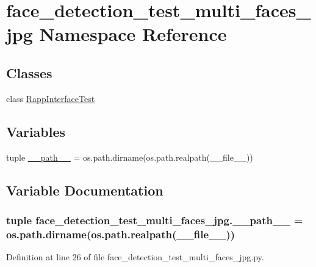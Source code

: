 \hypertarget{namespaceface__detection__test__multi__faces__jpg}{\section{face\-\_\-detection\-\_\-test\-\_\-multi\-\_\-faces\-\_\-jpg Namespace Reference}
\label{namespaceface__detection__test__multi__faces__jpg}
}
\subsection*{Classes}
\begin{DoxyCompactItemize}
\item 
class \hyperlink{classface__detection__test__multi__faces__jpg_1_1RappInterfaceTest}{Rapp\-Interface\-Test}
\end{DoxyCompactItemize}
\subsection*{Variables}
\begin{DoxyCompactItemize}
\item 
tuple \hyperlink{namespaceface__detection__test__multi__faces__jpg_a703f893beeec8d7b8bd155d64cff4725}{\-\_\-\-\_\-path\-\_\-\-\_\-} = os.\-path.\-dirname(os.\-path.\-realpath(\-\_\-\-\_\-file\-\_\-\-\_\-))
\end{DoxyCompactItemize}


\subsection{Variable Documentation}
\hypertarget{namespaceface__detection__test__multi__faces__jpg_a703f893beeec8d7b8bd155d64cff4725}{
\subsubsection[{\-\_\-\-\_\-path\-\_\-\-\_\-}]{\setlength{\rightskip}{0pt plus 5cm}tuple face\-\_\-detection\-\_\-test\-\_\-multi\-\_\-faces\-\_\-jpg.\-\_\-\-\_\-path\-\_\-\-\_\- = os.\-path.\-dirname(os.\-path.\-realpath(\-\_\-\-\_\-file\-\_\-\-\_\-))}}\label{namespaceface__detection__test__multi__faces__jpg_a703f893beeec8d7b8bd155d64cff4725}


Definition at line 26 of file face\-\_\-detection\-\_\-test\-\_\-multi\-\_\-faces\-\_\-jpg.\-py.

